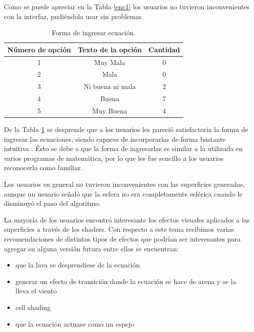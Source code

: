 \documentclass[12pt]{article}
\begin{document}
Como se puede apreciar en la Tabla \ref{enc1} los usuarios no tuvieron inconvenientes con la interfaz, pudiéndola usar sin problemas.

\begin{table}[h!]
  \centering
  \begin{tabular}{ccc}
    \toprule
    Número de opción &  Texto de la opción &Cantidad\\
    \midrule
    1 & Muy Mala & 0 \\
    2 & Mala & 0 \\
    3 & Ni buena ni mala & 2 \\
    4 & Buena & 7\\
    5 & Muy Buena & 4\\
    \bottomrule
  \end{tabular}
  \caption{Forma de ingresar ecuación.}
  \label{enc2}
\end{table}

De la Tabla \ref{enc2} se desprende que a los usuarios les pareció satisfactoria la forma de ingresar las ecuaciones, siendo capaces de incorporarlas de forma bastante intuitiva . Ésto se debe a que la forma de ingresarlas es similar a la utilizada en varios programas de matemática, por lo que les fue sencillo a los usuarios reconocerla como familiar.

Los usuarios en general no tuvieron inconvenientes con las superficies generadas, aunque un usuario señaló que la esfera no era completamente esférica cuando le disminuyó el paso del algoritmo. 

La mayoría de los usuarios encontró interesante los efectos visuales aplicados a las superficies a través de los shaders. Con respecto a este tema recibimos varias recomendaciones de distintos tipos de efectos que podrían ser interesantes para agregar en alguna versión futura entre ellos se encuentran: 
\begin{itemize}
\item que la lava se desprendiese de la ecuación
\item generar un efecto de transición donde la ecuación se hace de arena y se la lleva el viento
\item cell shading
\item que la ecuación actuase como un espejo
\end{itemize}
\end{document}
